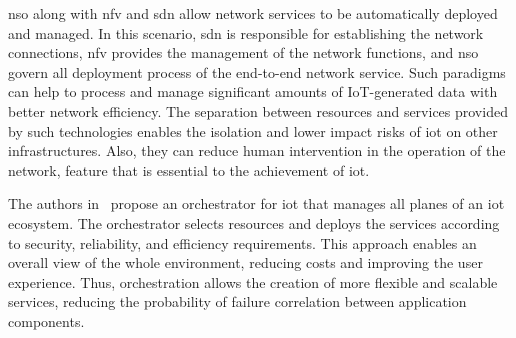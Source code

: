 \gls{nso} along with \gls{nfv} and \gls{sdn} allow network services to be automatically deployed and managed. In this scenario, \gls{sdn} is responsible for establishing the network connections, \gls{nfv} provides the management of the network functions, and \gls{nso} govern all deployment process of the end-to-end network service. Such paradigms can help to process and manage significant amounts of IoT-generated data with better network efficiency. The separation between resources and services provided by such technologies enables the isolation and lower impact risks of \gls{iot} on other infrastructures. Also, they can reduce human intervention in the operation of the network, feature that is essential to the achievement of \acrlong{iot}.

The authors in~\cite{Wen2017FogServices} propose an orchestrator for \acrlong{iot} that manages all planes of an \gls{iot} ecosystem. The orchestrator selects resources and deploys the services according to security, reliability, and efficiency requirements. This approach enables an overall view of the whole environment, reducing costs and improving the user experience. Thus, orchestration allows the creation of more flexible and scalable services, reducing the probability of failure correlation between application components. 



